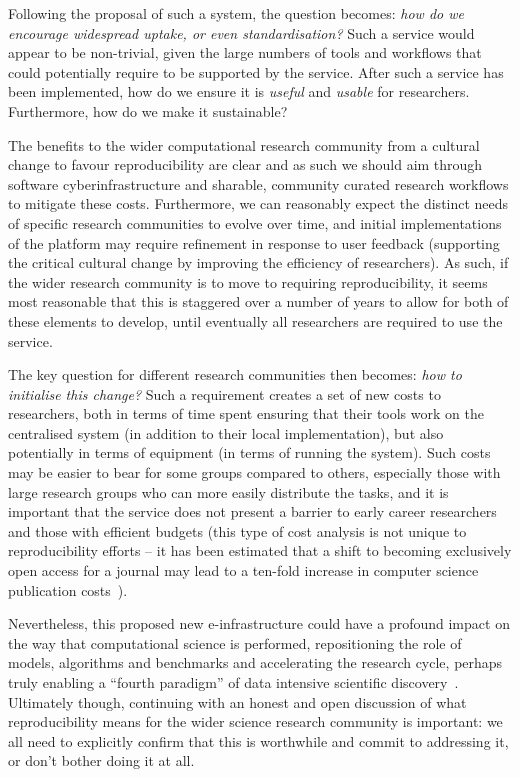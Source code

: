 \documentclass[a4paper,11pt]{article}
\begin{document}
Following the proposal of such a system, the question becomes:
{\emph{how do we encourage widespread uptake, or even
standardisation?}}  Such a service would appear to be non-trivial,
given the large numbers of tools and workflows that could potentially
require to be supported by the service. After such a service has been
implemented, how do we ensure it is \emph{useful} and \emph{usable}
for researchers. Furthermore, how do we make it sustainable?

The benefits to the wider computational research community from a
cultural change to favour reproducibility are clear and as such we
should aim through software cyberinfrastructure and sharable,
community curated research workflows to mitigate these
costs. Furthermore, we can reasonably expect the distinct needs of
specific research communities to evolve over time, and initial
implementations of the platform may require refinement in response to
user feedback (supporting the critical cultural change by improving
the efficiency of researchers). As such, if the wider research
community is to move to requiring reproducibility, it seems most
reasonable that this is staggered over a number of years to allow for
both of these elements to develop, until eventually all researchers
are required to use the service.

The key question for different research communities then becomes:
{\emph{how to initialise this change?}} Such a requirement creates a
set of new costs to researchers, both in terms of time spent ensuring
that their tools work on the centralised system (in addition to their
local implementation), but also potentially in terms of equipment (in
terms of running the system). Such costs may be easier to bear for
some groups compared to others, especially those with large research
groups who can more easily distribute the tasks, and it is important
that the service does not present a barrier to early career
researchers and those with efficient budgets (this type of cost
analysis is not unique to reproducibility efforts -- it has been
estimated that a shift to becoming exclusively open access for a
journal may lead to a ten-fold increase in computer science
publication costs~\cite{vardi-cacm-2014}).

Nevertheless, this proposed new e-infrastructure could have a profound
impact on the way that computational science is performed,
repositioning the role of models, algorithms and benchmarks and
accelerating the research cycle, perhaps truly enabling a ``fourth
paradigm'' of data intensive scientific discovery~\cite{hey:2009}.
Ultimately though, continuing with an honest and open discussion of
what reproducibility means for the wider science research community is
important: we all need to explicitly confirm that this is worthwhile
and commit to addressing it, or don't bother doing it at all.
\end{document}
